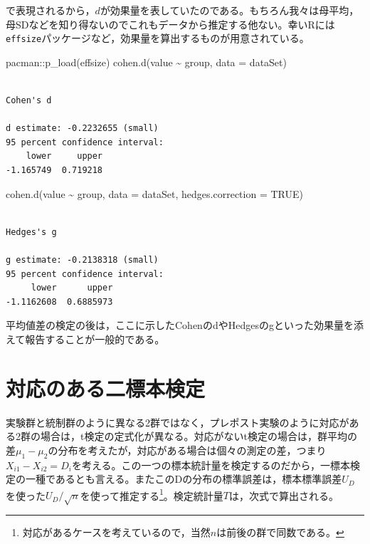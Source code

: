 \documentclass[
  a4paper,
]{ltjsbook}
\newenvironment{Shaded}{\begin{snugshade}}{\end{snugshade}}
\newcommand{\AttributeTok}[1]{\textcolor[rgb]{0.40,0.45,0.13}{#1}}
\newcommand{\ConstantTok}[1]{\textcolor[rgb]{0.56,0.35,0.01}{#1}}
\newcommand{\FunctionTok}[1]{\textcolor[rgb]{0.28,0.35,0.67}{#1}}
\newcommand{\NormalTok}[1]{\textcolor[rgb]{0.00,0.23,0.31}{#1}}
\newcommand{\SpecialCharTok}[1]{\textcolor[rgb]{0.37,0.37,0.37}{#1}}
\begin{document}
で表現されるから，\(d\)が効果量を表していたのである。もちろん我々は母平均，母SDなどを知り得ないのでこれもデータから推定する他ない。幸いRには\texttt{effsize}パッケージなど，効果量を算出するものが用意されている。

\begin{Shaded}
\begin{Highlighting}[]
\NormalTok{pacman}\SpecialCharTok{::}\FunctionTok{p\_load}\NormalTok{(effsize)}
\FunctionTok{cohen.d}\NormalTok{(value }\SpecialCharTok{\textasciitilde{}}\NormalTok{ group, }\AttributeTok{data =}\NormalTok{ dataSet)}
\end{Highlighting}
\end{Shaded}

\begin{verbatim}

Cohen's d

d estimate: -0.2232655 (small)
95 percent confidence interval:
    lower     upper 
-1.165749  0.719218 
\end{verbatim}

\begin{Shaded}
\begin{Highlighting}[]
\FunctionTok{cohen.d}\NormalTok{(value }\SpecialCharTok{\textasciitilde{}}\NormalTok{ group, }\AttributeTok{data =}\NormalTok{ dataSet, }\AttributeTok{hedges.correction =} \ConstantTok{TRUE}\NormalTok{)}
\end{Highlighting}
\end{Shaded}

\begin{verbatim}

Hedges's g

g estimate: -0.2138318 (small)
95 percent confidence interval:
     lower      upper 
-1.1162608  0.6885973 
\end{verbatim}

平均値差の検定の後は，ここに示したCohenのdやHedgesのgといった効果量を添えて報告することが一般的である。

\section{対応のある二標本検定}\label{ux5bfeux5fdcux306eux3042ux308bux4e8cux6a19ux672cux691cux5b9a}

実験群と統制群のように異なる2群ではなく，プレポスト実験のように対応がある2群の場合は，t検定の定式化が異なる。対応がないt検定の場合は，群平均の差\(\mu_1 - \mu_2\)の分布を考えたが，対応がある場合は個々の測定の差，つまり\(X_{i1} - X_{i2} = D_i\)を考える。この一つの標本統計量を検定するのだから，一標本検定の一種であるとも言える。またこのDの分布の標準誤差は，標本標準誤差\(U_D\)を使った\(U_D/\sqrt{n}\)を使って推定する\footnote{対応があるケースを考えているので，当然\(n\)は前後の群で同数である。}。検定統計量\(T\)は，次式で算出される。
\end{document}
